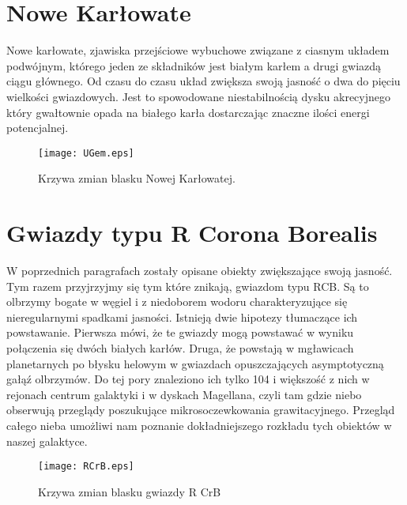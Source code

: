 \documentclass[polish,12pt]{pracamgr}
\begin{document}
\section{Nowe Karłowate}
Nowe karłowate, zjawiska przejściowe wybuchowe związane z ciasnym układem podwójnym, którego jeden ze składników jest białym karłem a drugi gwiazdą ciągu głównego. Od czasu do czasu układ zwiększa swoją jasność o dwa do pięciu wielkości gwiazdowych. Jest to spowodowane niestabilnością dysku akrecyjnego który gwałtownie opada na białego karła dostarczając znaczne ilości energi potencjalnej. 
\begin{figure}[!h]
\centering
\texttt{[image: UGem.eps]}
\caption{Krzywa zmian blasku Nowej Karłowatej.}
\label{Krzywa zmian blasku Nowej Karlowatej}
\end{figure}
\section{Gwiazdy typu R Corona Borealis}
W poprzednich paragrafach zostały opisane obiekty zwiększające swoją jasność. Tym razem przyjrzyjmy się tym które znikają, gwiazdom typu RCB. Są to olbrzymy bogate w węgiel i z niedoborem wodoru  charakteryzujące się nieregularnymi spadkami jasności. Istnieją dwie hipotezy tłumaczące ich powstawanie. Pierwsza mówi, że te gwiazdy mogą powstawać w wyniku połączenia się dwóch białych karłów. Druga, że powstają w mgławicach planetarnych po błysku helowym w gwiazdach opuszczających asymptotyczną gałąź olbrzymów. Do tej pory znaleziono ich tylko 104 i większość z nich w rejonach centrum galaktyki i w dyskach Magellana, czyli tam gdzie niebo obserwują przeglądy poszukujące mikrosoczewkowania grawitacyjnego. Przegląd całego nieba umożliwi nam poznanie dokładniejszego rozkładu tych obiektów w naszej galaktyce.%
\begin{figure}[!h]
\centering
\texttt{[image: RCrB.eps]}
\caption{Krzywa zmian blasku gwiazdy R CrB}
\label{Krzywa zmian blasku gwiazdy R CrB.}
\end{figure}
\end{document}
